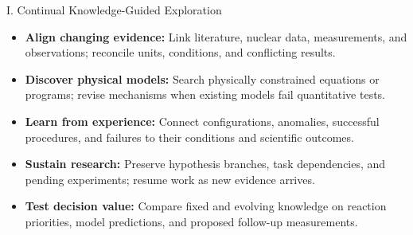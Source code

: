 \setsource{}
\begin{frame}[t,label=md-55]{I. Continual Knowledge-Guided Exploration}
\small
\begin{itemize}
\setlength{\itemsep}{0.65em}
    \item \textbf{Align changing evidence:} Link literature, nuclear data,
    measurements, and observations; reconcile units, conditions, and conflicting results.
    \item \textbf{Discover physical models:} Search physically constrained
    equations or programs; revise mechanisms when existing models fail quantitative tests.
    \item \textbf{Learn from experience:} Connect configurations, anomalies,
    successful procedures, and failures to their conditions and scientific outcomes.
    \item \textbf{Sustain research:} Preserve hypothesis branches, task
    dependencies, and pending experiments; resume work as new evidence arrives.
    \item \textbf{Test decision value:} Compare fixed and evolving knowledge
    on reaction priorities, model predictions, and proposed follow-up measurements.
\end{itemize}
\end{frame}

